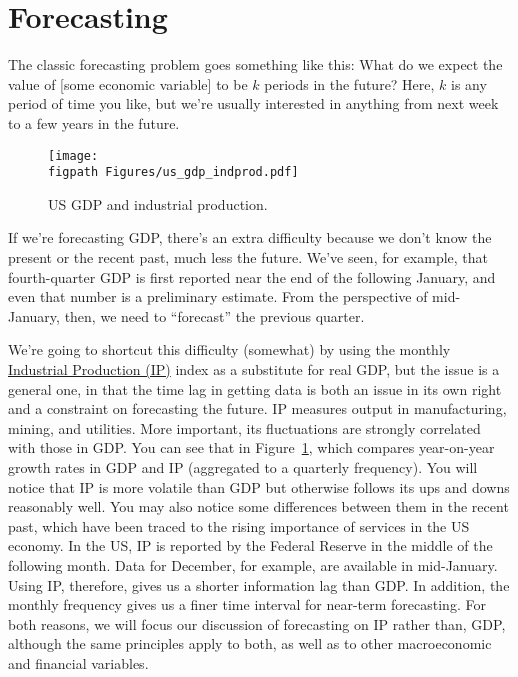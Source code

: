 \section{Forecasting }

The classic forecasting problem goes something like this:
What do we expect the value of [some
economic variable] to be $k$ periods in the future?
Here, $k$ is any period of time you like, but
we're usually interested in anything from next week to a few years in
the future.

\begin{figure}
    \caption{US GDP and industrial production.}
    \label{fig:ip_gdp}%
    \centering
    \texttt{[image: \\figpath Figures/us\_gdp\_indprod.pdf]}
\end{figure}


If we're forecasting GDP, there's an extra difficulty because we don't
know the present or the recent past, much less the future. We've
seen, for example, that fourth-quarter GDP is first reported near
the end of the following January, and even that number is a
preliminary estimate. From the perspective of mid-January, then,
we need to ``forecast'' the previous quarter.


We're going to shortcut this difficulty (somewhat) by using the
monthly \href{http://research.stlouisfed.org/fred2/series/INDPRO?cid=3}{Industrial Production (IP)} index as a substitute for real
GDP, but the issue is a general one, in that the time lag in getting data
is both an issue in its own right and a  constraint on forecasting
the future. IP measures output in manufacturing, mining, and
utilities. More important, its fluctuations are strongly
correlated with those in GDP.  You can see that in
Figure~\ref{fig:ip_gdp}, which compares year-on-year growth rates
in GDP and IP (aggregated to a quarterly frequency). You will
notice that IP is more volatile than GDP but otherwise follows its
ups and downs reasonably well.  You may also notice some
differences between them in the recent past, which have been
traced to the rising importance of services in the US economy.  In
the US, IP is reported by the Federal Reserve in the middle of the
following month.  Data for December, for example, are available in
mid-January.  Using IP, therefore, gives us a shorter information
lag than GDP.  In addition, the monthly frequency gives us a finer
time interval for near-term forecasting.  For both reasons, we
will focus our discussion of forecasting on IP rather than, GDP,
although the same principles apply to both, as well as to other
macroeconomic and financial variables.

